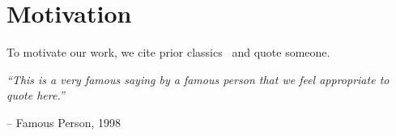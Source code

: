 \section{Motivation}
\label{sec:intro:motivation}

To motivate our work, we cite prior classics~\cite{paxos-parliament, paxos-made-simple} and quote someone.

\tightquote
\textit{``This is a very famous saying by a famous person that we feel appropriate to quote here.''}
\vspace*{-3pt}
\begin{flushright}
    -- Famous Person, 1998~\cite{paxos-parliament}
\end{flushright}
\endtightquote
